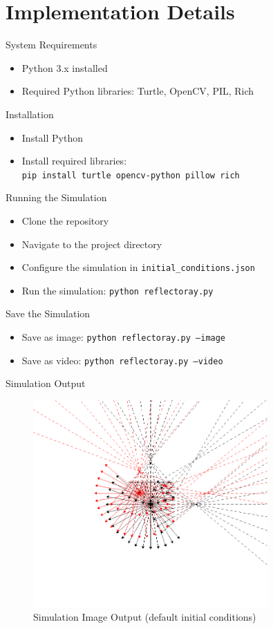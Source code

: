 \documentclass{beamer}
\begin{document}
\section{Implementation Details}

\begin{frame}{System Requirements}
  \begin{itemize}
    \item Python 3.x installed
    \item Required Python libraries: Turtle, OpenCV, PIL, Rich
  \end{itemize}
\end{frame}

\begin{frame}{Installation}
  \begin{itemize}
    \item Install Python
    \item Install required libraries: \\
          \texttt{pip install turtle opencv-python pillow rich}
  \end{itemize}
\end{frame}

\begin{frame}{Running the Simulation}
  \begin{itemize}
    \item Clone the repository
    \item Navigate to the project directory
    \item Configure the simulation in \texttt{initial\_conditions.json}
    \item Run the simulation: \texttt{python reflectoray.py}
  \end{itemize}
\end{frame}

\begin{frame}{Save the Simulation}
  \begin{itemize}
    \item Save as image: \texttt{python reflectoray.py --image}
    \item Save as video: \texttt{python reflectoray.py --video}
  \end{itemize}
\end{frame}

\begin{frame}{Simulation Output}
  \begin{figure}
    \includegraphics[width=0.8\textwidth]{figures/20231106-112653.png}
    \caption{Simulation Image Output (default initial conditions)}
  \end{figure}
\end{frame}
\end{document}

